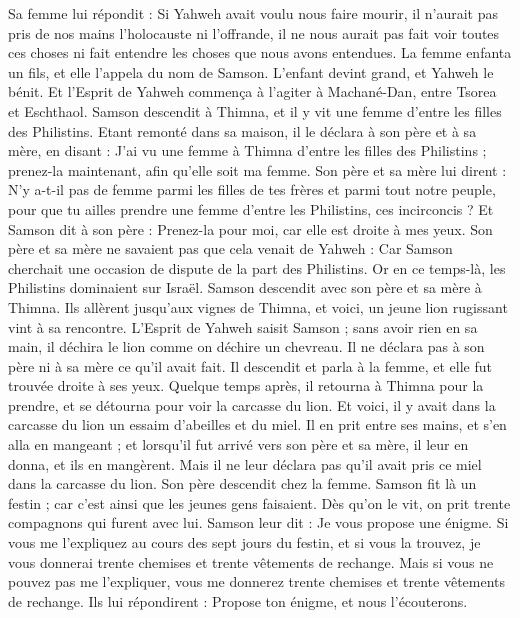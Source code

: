 \begin{multicols}{2}
Sa femme lui répondit : Si Yahweh avait voulu nous faire mourir, il n'aurait pas pris de nos mains l'holocauste ni l'offrande, il ne nous aurait pas fait voir toutes ces choses ni fait entendre les choses que nous avons entendues.
La femme enfanta un fils, et elle l'appela du nom de Samson. L'enfant devint grand, et Yahweh le bénit.
Et l'Esprit de Yahweh commença à l'agiter à Machané-Dan, entre Tsorea et Eschthaol.
\VerseOne{}Samson descendit à Thimna, et il y vit une femme d'entre les filles des Philistins.
Etant remonté dans sa maison, il le déclara à son père et à sa mère, en disant : J'ai vu une femme à Thimna d'entre les filles des Philistins ; prenez-la maintenant, afin qu'elle soit ma femme.
Son père et sa mère lui dirent : N'y a-t-il pas de femme parmi les filles de tes frères et parmi tout notre peuple, pour que tu ailles prendre une femme d'entre les Philistins, ces incirconcis ? Et Samson dit à son père : Prenez-la pour moi, car elle est droite à mes yeux.
Son père et sa mère ne savaient pas que cela venait de Yahweh : Car Samson cherchait une occasion de dispute de la part des Philistins. Or en ce temps-là, les Philistins dominaient sur Israël.
Samson descendit avec son père et sa mère à Thimna. Ils allèrent jusqu'aux vignes de Thimna, et voici, un jeune lion rugissant vint à sa rencontre.
L'Esprit de Yahweh saisit Samson ; sans avoir rien en sa main, il déchira le lion comme on déchire un chevreau. Il ne déclara pas à son père ni à sa mère ce qu'il avait fait.
Il descendit et parla à la femme, et elle fut trouvée droite à ses yeux.
Quelque temps après, il retourna à Thimna pour la prendre, et se détourna pour voir la carcasse du lion. Et voici, il y avait dans la carcasse du lion un essaim d'abeilles et du miel.
Il en prit entre ses mains, et s'en alla en mangeant ; et lorsqu'il fut arrivé vers son père et sa mère, il leur en donna, et ils en mangèrent. Mais il ne leur déclara pas qu'il avait pris ce miel dans la carcasse du lion.
Son père descendit chez la femme. Samson fit là un festin ; car c'est ainsi que les jeunes gens faisaient.
Dès qu'on le vit, on prit trente compagnons qui furent avec lui.
Samson leur dit : Je vous propose une énigme. Si vous me l'expliquez au cours des sept jours du festin, et si vous la trouvez, je vous donnerai trente chemises et trente vêtements de rechange.
Mais si vous ne pouvez pas me l'expliquer, vous me donnerez trente chemises et trente vêtements de rechange. Ils lui répondirent : Propose ton énigme, et nous l'écouterons.

\end{multicols}
